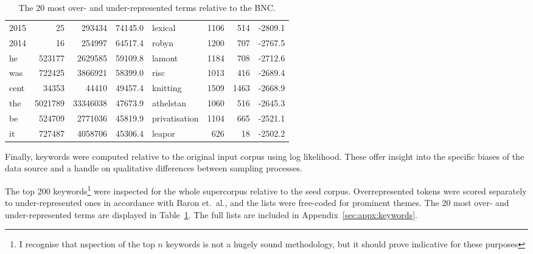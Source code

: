 \begin{table}[htb]
\begin{tabular}{|lrrr||lrrr|}
        2015       & 25             & 293434          & 74145.0      & lexical       & 1106           & 514             & -2809.1      \\
        2014       & 16             & 254997          & 64517.4      & robyn         & 1200           & 707             & -2767.5      \\
        he         & 523177         & 2629585         & 59109.8      & lamont        & 1184           & 708             & -2712.6      \\
        was        & 722425         & 3866921         & 58399.0      & risc          & 1013           & 416             & -2689.4      \\
        cent       & 34353          & 44410           & 49457.4      & knitting      & 1509           & 1463            & -2668.9      \\
        the        & 5021789        & 33346038        & 47673.9      & athelstan     & 1060           & 516             & -2645.3      \\
        be         & 524709         & 2771036         & 45819.9      & privatisation & 1104           & 665             & -2521.1      \\
        it         & 727487         & 4058706         & 45306.4      & leapor        & 626            & 18              & -2502.2      \\ \hline
    \end{tabular}

    \caption{The 20 most over- and under-represented terms relative to the BNC.}
    \label{table:evaluation:retrieval:keywords}

\end{table}





Finally, keywords were computed relative to the original input corpus using log likelihood.  These offer insight into the specific biases of the data source and a handle on qualitative differences between sampling processes.  



The top 200 keywords\footnote{I recognise that nspection of the top $n$ keywords is not a hugely sound methodology, but it should prove indicative for these purposes} were inspected for the whole supercorpus relative to the seed corpus. Overrepresented tokens were scored separately to under-represented ones in accordance with Baron et.\ al.\cite{baron2009word}, and the lists were free-coded for prominent themes.  The 20 most over- and under-represented terms are displayed in Table~\ref{table:evaluation:retrieval:keywords}.  The full lists are included in Appendix~\ref{sec:appx:keywords}.

